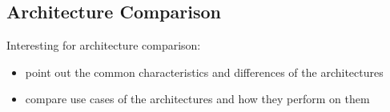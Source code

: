 \subsection{Architecture Comparison}
Interesting for architecture comparison: \cite{imseg_architecures}

\begin{itemize}
    \item point out the common characteristics and differences of the architectures
    \item compare use cases of the architectures and how they perform on them
\end{itemize}

\newpage